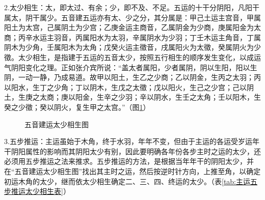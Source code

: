 \documentclass[12pt]{ctexbook}
\begin{document}
2.太少相生：太，即太过、有余；少，即不及、不足。五运的十干分阴阳，凡阳干属太，阴干属少。五音建五运亦有太、少之分，其分属是：甲己土运主宫音，甲属阳土为太宫，己属阴土为少宫；乙庚金运主商音，乙属阴金为少商，庚属阳金为太商；丙辛水运主羽音，丙属阳水为太羽，辛属阴水为少羽；丁壬木运主角音，丁属阴木为少角，壬属阳木为太角；戊癸火运主徵音，戌属阳火为太徵，癸属阴火为少徵。太少相生，是指建于五运的五音太少，按照五行相生的顺序发生变化，以成运气阴阳变化之理。正如张介宾所说：“盖太者属阳，少者属阴，阴以生阳，阳以生阴，一动一静，乃成易道。故甲以阳土，生乙之少商；乙以阴金，生丙之太羽；丙以阳水，生丁之少角；丁以阴木，生戊之太徵；戊以阳火，生己之少宫；己以阴土，生庚之太商；庚以阳金，生辛之少羽；辛以阴水，生壬之太角；壬以阳木，生癸之少徵；癸以阴火，复生甲之太宫。”（图\ref{fig:五音建运太少相生图}）

\begin{figure}[htb]%
	\centering
	\caption{五音建运太少相生图}\label{fig:五音建运太少相生图}
\end{figure}

3.五步推运：主运虽始于木角，终于水羽，年年不变，但由于主运的各运受岁运年干阴阳属性的影响而其阴阳太少有别，因此要明确各年份各步主时之运的太少，还必须用五步推运之法来推求。五步推运的方法，是根据当年年干的阴阳太少，并在“五音建运太少相生图”找出其主时之运，然后按逆时针方向，上推至角，以确定初运木角的太少，继而依太少相生确定二、三、四、终运的太少。（表\ref{tab:主运五步推运太少相生表}）
\end{document}
